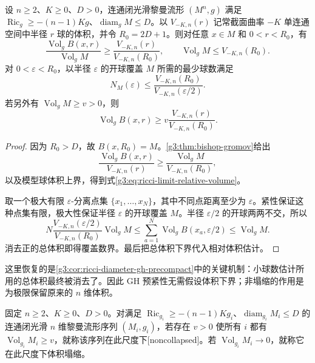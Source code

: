 \begin{proposition}\label{g3:prop:ricci-limit-volume-packing}
	设 \(n\ge2\)、\(K\ge0\)、\(D>0\)，连通闭光滑黎曼流形 \((M^n,g)\) 满足 \(\operatorname{Ric}_g\ge-(n-1)Kg\)、\(\operatorname{diam}_gM\le D\)。以 \(V_{-K,n}(r)\) 记常截面曲率 \(-K\) 单连通空间中半径 \(r\) 球的体积，并令 \(R_0=2D+1\)。则对任意 \(x\in M\) 和 \(0<r<R_0\)，有
	\begin{equation}\label{g3:eq:ricci-limit-relative-volume}
		\frac{\operatorname{Vol}_gB(x,r)}{\operatorname{Vol}_gM}
		\ge\frac{V_{-K,n}(r)}{V_{-K,n}(R_0)},
		\qquad \operatorname{Vol}_gM\le V_{-K,n}(R_0).
	\end{equation}
	对 \(0<\varepsilon<R_0\)，以半径 \(\varepsilon\) 的开球覆盖 \(M\) 所需的最少球数满足
	\begin{equation}\label{g3:eq:ricci-limit-packing}
		N_M(\varepsilon)
		\le\frac{V_{-K,n}(R_0)}{V_{-K,n}(\varepsilon/2)}.
	\end{equation}
	若另外有 \(\operatorname{Vol}_gM\ge v>0\)，则
	\begin{equation}\label{g3:eq:ricci-limit-noncollapse-balls}
		\operatorname{Vol}_gB(x,r)
		\ge v\frac{V_{-K,n}(r)}{V_{-K,n}(R_0)}.
	\end{equation}
\end{proposition}
\begin{proof}
	因为 \(R_0>D\)，故 \(B(x,R_0)=M\)。\cref{g3:thm:bishop-gromov}给出
	\[
		\frac{\operatorname{Vol}_gB(x,r)}{V_{-K,n}(r)}
		\ge\frac{\operatorname{Vol}_gM}{V_{-K,n}(R_0)},
	\]
	以及模型球体积上界，得到式\eqref{g3:eq:ricci-limit-relative-volume}。

	取一个极大有限 \(\varepsilon\)-分离点集 \(\{x_1,\ldots,x_N\}\)，其中不同点距离至少为 \(\varepsilon\)。紧性保证这种点集有限，极大性保证半径 \(\varepsilon\) 的开球覆盖 \(M\)。半径 \(\varepsilon/2\) 的开球两两不交，所以
	\[
		N\frac{V_{-K,n}(\varepsilon/2)}{V_{-K,n}(R_0)}
		\operatorname{Vol}_gM
		\le\sum_{a=1}^N\operatorname{Vol}_gB(x_a,\varepsilon/2)
		\le\operatorname{Vol}_gM.
	\]
	消去正的总体积即得覆盖数界。最后把总体积下界代入相对体积估计。
\end{proof}

这里恢复的是\cref{g3:cor:ricci-diameter-gh-precompact}中的关键机制：小球数估计所用的总体积最终被消去了。因此 GH 预紧性无需假设体积下界；非塌缩的作用是为极限保留原来的 \(n\) 维体积。

\begin{definition}\label{g3:def:ricci-limit-noncollapse}
	固定 \(n\ge2\)、\(K\ge0\)、\(D>0\)。对满足 \(\operatorname{Ric}_{g_i}\ge-(n-1)Kg_i\)、\(\operatorname{diam}_{g_i}M_i\le D\) 的连通闭光滑 \(n\) 维黎曼流形序列 \((M_i,g_i)\)，若存在 \(v>0\) 使所有 \(i\) 都有 \(\operatorname{Vol}_{g_i}M_i\ge v\)，就称该序列在此尺度下[noncollapsed]。若 \(\operatorname{Vol}_{g_i}M_i\to0\)，就称它在此尺度下体积塌缩。
\end{definition}


